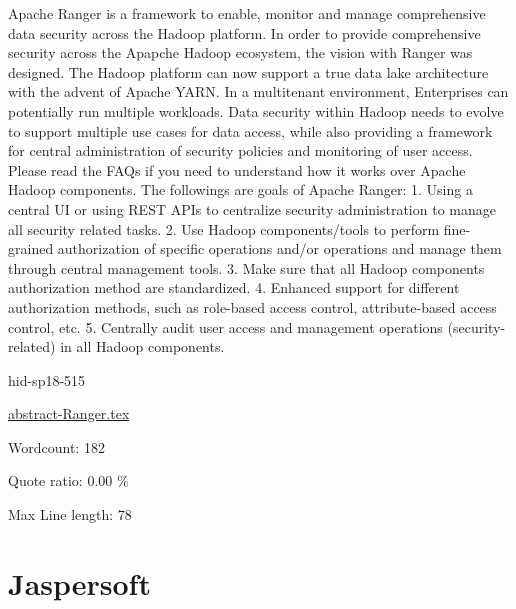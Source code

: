 Apache Ranger\cite{hid-sp18-515-www-ranger} is a framework to enable, 
monitor and manage comprehensive data security across the Hadoop 
platform.
In order to provide comprehensive security across the Apapche Hadoop 
ecosystem, the vision with Ranger was designed.
The Hadoop platform can now support a true data lake architecture with
the advent of Apache YARN.
In a multitenant environment, Enterprises can potentially run multiple 
workloads.
Data security within Hadoop needs to evolve to support multiple use cases 
for data access, while also providing a framework for central 
administration of security policies and monitoring of user access.
Please read the FAQs if you need to understand how it works over 
Apache Hadoop components.
The followings are goals of Apache Ranger:
1. Using a central UI or using REST APIs to centralize security 
administration to manage all security related tasks.
2. Use Hadoop components/tools to perform fine-grained authorization 
of specific operations and/or operations and manage them through 
central management tools.
3. Make sure that all Hadoop components authorization method are standardized.
4. Enhanced support for different authorization methods, such as 
role-based access control, attribute-based access control, etc.
5. Centrally audit user access and management operations 
(security-related) in all Hadoop components.


\begin{IU}

hid-sp18-515

\href{https://github.com/cloudmesh-community/hid-sp18-515/blob/master//technology/abstract-Ranger.tex}{abstract-Ranger.tex}

 

Wordcount: 182


Quote ratio: 0.00 \%
 
Max Line length: 78
\end{IU}

\section{Jaspersoft}

